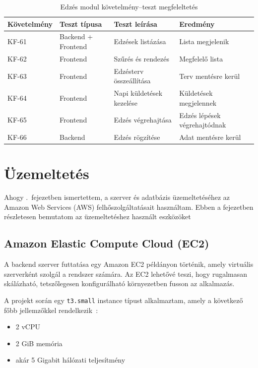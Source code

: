 \documentclass[
]{thesis-ekf}
\theoremstyle{definition}
\theoremstyle{remark}
\begin{document}
\begin{table}[!ht]
\centering
\begin{tabularx}{\textwidth}{|l|l|X|X|}
\hline
\textbf{Követelmény} & \textbf{Teszt típusa} & \textbf{Teszt leírása} & \textbf{Eredmény} \\ \hline
KF-61 & Backend + Frontend & Edzések listázása & Lista megjelenik \\ \hline
KF-62 & Frontend & Szűrés és rendezés & Megfelelő lista \\ \hline
KF-63 & Frontend & Edzésterv összeállítása & Terv mentésre kerül \\ \hline
KF-64 & Frontend & Napi küldetések kezelése & Küldetések megjelennek \\ \hline
KF-65 & Frontend & Edzés végrehajtása & Edzés lépések végrehajtódnak \\ \hline
KF-66 & Backend & Edzés rögzítése & Adat mentésre kerül \\ \hline
\end{tabularx}
\caption{Edzés modul követelmény–teszt megfeleltetés}
\label{tab_workout_tests}
\end{table}

\chapter{Üzemeltetés}
\label{chap_release}

Ahogy .\ fejezetben ismertettem, a szerver és adatbázis üzemeltetéséhez az Amazon Web Services (AWS) felhőszolgáltatásait használtam. Ebben a fejezetben részletesen bemutatom az üzemeltetéshez használt eszközöket

\section{Amazon Elastic Compute Cloud (EC2)}

A backend szerver futtatása egy Amazon EC2 példányon történik, amely virtuális szerverként szolgál a rendszer számára. Az EC2 lehetővé teszi, hogy rugalmasan skálázható, tetszőlegesen konfigurálható környezetben fusson az alkalmazás.

A projekt során egy \texttt{t3.small} instance típust alkalmaztam, amely a következő főbb jellemzőkkel rendelkezik~\cite{aws_ec2_t3small}:

\begin{itemize}
    \item 2 vCPU
    \item 2 GiB memória
    \item akár 5 Gigabit hálózati teljesítmény
\end{itemize}
\end{document}
